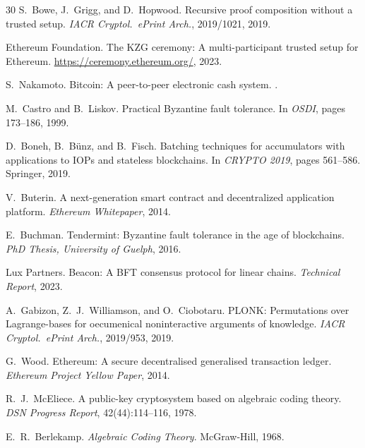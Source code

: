 \documentclass[11pt,a4paper]{article}
\theoremstyle{plain}
\theoremstyle{definition}
\theoremstyle{remark}
\begin{document}
\begin{thebibliography}{30}
S.~Bowe, J.~Grigg, and D.~Hopwood.
\newblock Recursive proof composition without a trusted setup.
\newblock \emph{IACR Cryptol.\ ePrint Arch.}, 2019/1021, 2019.

Ethereum Foundation.
\newblock The KZG ceremony: A multi-participant trusted setup for Ethereum.
\newblock \url{https://ceremony.ethereum.org/}, 2023.

S.~Nakamoto.
\newblock Bitcoin: A peer-to-peer electronic cash system.
.

M.~Castro and B.~Liskov.
\newblock Practical Byzantine fault tolerance.
\newblock In \emph{OSDI}, pages 173--186, 1999.

D.~Boneh, B.~B{\"u}nz, and B.~Fisch.
\newblock Batching techniques for accumulators with applications to IOPs and
  stateless blockchains.
\newblock In \emph{CRYPTO 2019}, pages 561--586. Springer, 2019.

V.~Buterin.
\newblock A next-generation smart contract and decentralized application
  platform.
\newblock \emph{Ethereum Whitepaper}, 2014.

E.~Buchman.
\newblock Tendermint: Byzantine fault tolerance in the age of blockchains.
\newblock \emph{PhD Thesis, University of Guelph}, 2016.

Lux Partners.
\newblock Beacon: A BFT consensus protocol for linear chains.
\newblock \emph{Technical Report}, 2023.

A.~Gabizon, Z.~J.~Williamson, and O.~Ciobotaru.
\newblock PLONK: Permutations over Lagrange-bases for oecumenical
  noninteractive arguments of knowledge.
\newblock \emph{IACR Cryptol.\ ePrint Arch.}, 2019/953, 2019.

G.~Wood.
\newblock Ethereum: A secure decentralised generalised transaction ledger.
\newblock \emph{Ethereum Project Yellow Paper}, 2014.

R.~J.~McEliece.
\newblock A public-key cryptosystem based on algebraic coding theory.
\newblock \emph{DSN Progress Report}, 42(44):114--116, 1978.

E.~R.~Berlekamp.
\newblock \emph{Algebraic Coding Theory}.
\newblock McGraw-Hill, 1968.

\end{thebibliography}
\end{document}
